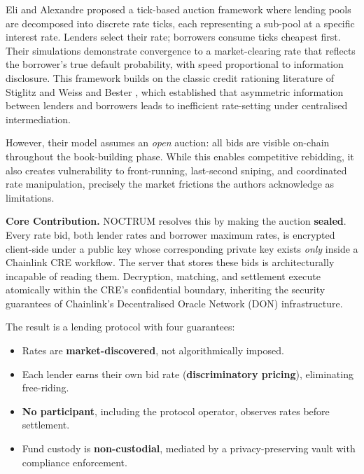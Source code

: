 \documentclass[a4paper,11pt]{article}
\begin{document}
Eli and Alexandre \cite{eli2025} proposed a tick-based auction framework
where lending pools are decomposed into discrete rate ticks, each
representing a sub-pool at a specific interest rate. Lenders select their
rate; borrowers consume ticks cheapest first. Their simulations demonstrate
convergence to a market-clearing rate that reflects the borrower's true
default probability, with speed proportional to information disclosure.
This framework builds on the classic credit rationing literature of
Stiglitz and Weiss \cite{stiglitz1981} and Bester \cite{bester1985}, which
established that asymmetric information between lenders and borrowers leads
to inefficient rate-setting under centralised intermediation.

However, their model assumes an \textit{open} auction: all bids are visible
on-chain throughout the book-building phase. While this enables competitive
rebidding, it also creates vulnerability to front-running, last-second
sniping, and coordinated rate manipulation, precisely the market frictions
the authors acknowledge as limitations.

\begin{tcolorbox}[colback=backcolour, colframe=gray, arc=2pt, boxrule=0.5pt]
\small\textbf{Core Contribution.}\quad
NOCTRUM resolves this by making the auction \textbf{sealed}. Every rate bid,
both lender rates and borrower maximum rates, is encrypted client-side
under a public key whose corresponding private key exists \textit{only}
inside a Chainlink CRE workflow. The server that stores these bids is
architecturally incapable of reading them. Decryption, matching, and
settlement execute atomically within the CRE's confidential boundary,
inheriting the security guarantees of Chainlink's Decentralised Oracle
Network (DON) infrastructure.
\end{tcolorbox}

The result is a lending protocol with four guarantees:

\begin{itemize}[leftmargin=1.4em, itemsep=3pt]
  \item Rates are \textbf{market-discovered}, not algorithmically imposed.
  \item Each lender earns their own bid rate (\textbf{discriminatory
        pricing}), eliminating free-riding.
  \item \textbf{No participant}, including the protocol operator, observes
        rates before settlement.
  \item Fund custody is \textbf{non-custodial}, mediated by a
        privacy-preserving vault with compliance enforcement.
\end{itemize}
\end{document}
